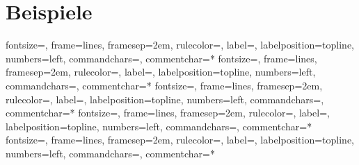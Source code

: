 \documentclass[a4paper, notitlepage, 12pt]{scrartcl}
\begin{document}
 \section{Beispiele}
{fontsize=\footnotesize,
 frame=lines,  %
 framesep=2em, %
 rulecolor=\color{Gray},
 label=,
 labelposition=topline,
 numbers=left,
 commandchars=\|\(\), %
 commentchar=*        %
}
%
{fontsize=\footnotesize,
 frame=lines,  %
 framesep=2em, %
 rulecolor=\color{Gray},
 label=,
 labelposition=topline,
 numbers=left,
 commandchars=\|\(\), %
 commentchar=*        %
}
{fontsize=\footnotesize,
 frame=lines,  %
 framesep=2em, %
 rulecolor=\color{Gray},
 label=,
 labelposition=topline,
 numbers=left,
 commandchars=\|\(\), %
 commentchar=*        %
}
{fontsize=\footnotesize,
 frame=lines,  %
 framesep=2em, %
 rulecolor=\color{Gray},
 label=,
 labelposition=topline,
 numbers=left,
 commandchars=\|\(\), %
 commentchar=*        %
}
{fontsize=\footnotesize,
 frame=lines,  %
 framesep=2em, %
 rulecolor=\color{Gray},
 label=,
 labelposition=topline,
 numbers=left,
 commandchars=\|\(\), %
 commentchar=*        %
}
\end{document}
